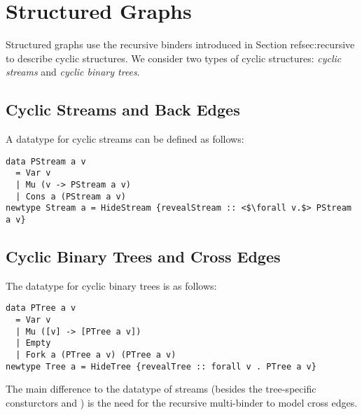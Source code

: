 \section{Structured Graphs}\label{sec:graphs}

Structured graphs use the recursive binders introduced in Section ref{sec:recursive} to describe cyclic structures. We consider two types of cyclic structures: \emph{cyclic streams} and \emph{cyclic binary trees}.

\subsection{Cyclic Streams and Back Edges}
\label{subsec:streams}

A datatype for cyclic streams can be defined as follows:

\vspace{1mm}
\begin{verbatim}
data PStream a v
  = Var v
  | Mu (v -> PStream a v)
  | Cons a (PStream a v)
newtype Stream a = HideStream {revealStream :: <$\forall v.$> PStream a v}
\end{verbatim}
\vspace{1mm}

\subsection{Cyclic Binary Trees and Cross Edges}
\label{subsec:trees}

The datatype for cyclic binary trees is as follows:

\vspace{1mm}
\begin{verbatim}
data PTree a v
  = Var v
  | Mu ([v] -> [PTree a v])
  | Empty
  | Fork a (PTree a v) (PTree a v)
newtype Tree a = HideTree {revealTree :: forall v . PTree a v}
\end{verbatim}
\vspace{1mm}

The main difference to the datatype of streams (besides the tree-specific consturctors  and ) is the need for the recursive multi-binder to model cross edges.
